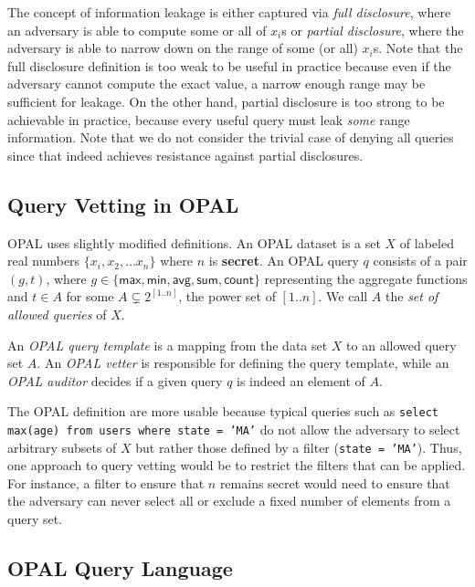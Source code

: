 The concept of information leakage is either captured via {\em full disclosure}, where an adversary is able to compute some or all of $x_i$s or {\em partial disclosure}, where the adversary is able to narrow down on the range of some (or all) $x_i$s. Note that the full disclosure definition is too weak to be useful in practice because even if the adversary cannot compute the exact value, a narrow enough range may be sufficient for leakage. On the other hand, partial disclosure is too strong to be achievable in practice, because every useful query must leak {\em some} range information. Note that we do not consider the trivial case of denying all queries since that indeed achieves resistance against partial disclosures.

\subsection{Query Vetting in OPAL}

OPAL uses slightly modified definitions. An {OPAL dataset} is a set $X$ of labeled real numbers $\{x_i, x_2,\ldots x_n\}$ where $n$ is \textbf{secret}. An OPAL query $q$ consists of a pair $(g, t)$, where $g\in \{\textsf{max}, \textsf{min}, \textsf{avg}, \textsf{sum}, \textsf{count}\}$ representing the aggregate functions and $t\in A$ for some $A\subsetneq 2^{[1..n]}$, the power set of $[1..n]$. We call $A$ the {\em set of allowed queries} of $X$. 

An {\em OPAL query template} is a mapping from the data set $X$ to an allowed query set $A$. An {\em OPAL vetter} is responsible for defining the query template, while an {\em OPAL auditor} decides if a given query $q$ is indeed an element of $A$.

The OPAL definition are more usable because typical queries such as \texttt{select max(age) from users where state = 'MA'} do not allow the adversary to select arbitrary subsets of $X$ but rather those defined by a filter (\texttt{state = 'MA'}). Thus, one approach to query vetting would be to restrict the filters that can be applied. For instance, a filter to ensure that $n$ remains secret would need to ensure that the adversary can never select all or exclude a fixed number of elements from a query set.

\subsection{OPAL Query Language}

